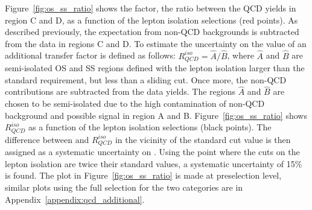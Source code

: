 Figure~\ref{fig:os_ss_ratio} shows the \rqcd factor, the ratio between the QCD 
yields in region C and D, as a function of the lepton isolation selections (red points).
As described previously, the expectation from non-QCD backgrounds is subtracted from the data in regions C and D.
To estimate the uncertainty on the value of \rqcd  an additional transfer factor is defined as follows: $R_{QCD}^{iso}  = \hat{A} / \hat{B}$,
where  $\hat{A}$ and $\hat{B}$  are semi-isolated OS and SS regions defined with the lepton isolation larger than the standard requirement, 
but less than a sliding cut. Once more, the non-QCD contributions are subtracted from the data yields.
The regions $\hat{A}$ and $\hat{B}$ are chosen to be semi-isolated 
due to the high contamination of non-QCD background and possible signal in region A and B. 
Figure~\ref{fig:os_ss_ratio} shows $R_{QCD}^{iso}$ as a function of the lepton isolation selections (black points).
The difference between \rqcd and $R_{QCD}^{iso} $ in the vicinity of the standard cut value is then assigned as a systematic uncertainty on \rqcd. Using the point where the cuts on the lepton isolation are twice their standard values, a systematic uncertainty of 15\% is found.
The plot in Figure~\ref{fig:os_ss_ratio} is made at preselection level, similar plots using the full selection
for the two categories are in Appendix~\ref{appendix:qcd_additional}.



